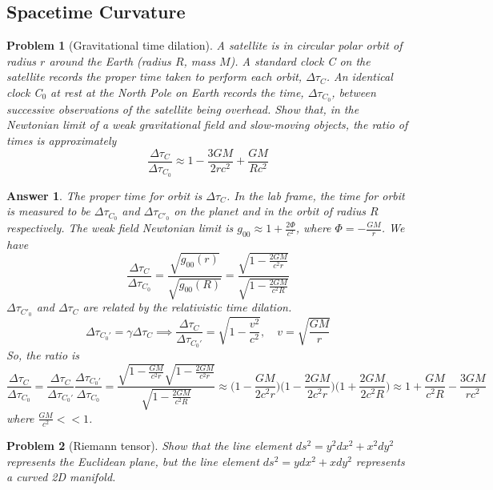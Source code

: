 \documentclass[a4paper]{article}
\theoremstyle{new2}
\newtheorem{ans}{Answer}[section]
\theoremstyle{new}
\newtheorem{qns}{Problem}[section]
\begin{document}
\subsection*{Spacetime Curvature}
\begin{qns}[Gravitational time dilation]
A satellite is in circular polar orbit of radius $r$ around the Earth (radius $R$, mass $M$). A standard clock C on the satellite records the proper time taken to perform each orbit, $\Delta\tau_C$. An identical clock C$_0$ at rest at the North Pole on Earth records the time, $\Delta\tau_{C_0}$, between successive observations of the satellite being overhead. Show that, in the Newtonian limit of a weak gravitational field and slow-moving objects, the ratio of times is approximately
$$\frac{\Delta\tau_C}{\Delta\tau_{C_0}}\approx 1-\frac{3GM}{2rc^2}+\frac{GM}{Rc^2}$$
\end{qns}
\begin{ans}
The proper time for orbit is $\Delta\tau_C$. In the lab frame, the time for orbit is measured to be $\Delta\tau_{C_0}$ and $\Delta\tau_{C'_0}$ on the planet and in the orbit of radius $R$ respectively. The weak field Newtonian limit is $g_{00}\approx1+\frac{2\Phi}{c^2}$, where $\Phi=-\frac{GM}{r}$. We have
$$\frac{\Delta\tau_C}{\Delta\tau_{C_0}}=\frac{\sqrt{g_{00}(r)}}{\sqrt{g_{00}(R)}}=\frac{\sqrt{1-\frac{2GM}{c^2r}}}{\sqrt{1-\frac{2GM}{c^2R}}}$$
$\Delta\tau_{C'_0}$ and $\Delta\tau_C$ are related by the relativistic time dilation.
$$\Delta\tau_{C_0'}=\gamma\Delta\tau_C\implies\frac{\Delta\tau_C}{\Delta\tau_{C_0'}}=\sqrt{1-\frac{v^2}{c^2}},\quad v=\sqrt{\frac{GM}{r}}$$
So, the ratio is
$$\frac{\Delta\tau_C}{\Delta\tau_{C_0}}=\frac{\Delta\tau_C}{\Delta\tau_{C_0'}}\frac{\Delta\tau_{C_0'}}{\Delta\tau_{C_0}}=\frac{\sqrt{1-\frac{GM}{c^2r}}\sqrt{1-\frac{2GM}{c^2r}}}{\sqrt{1-\frac{2GM}{c^2R}}}\approx\bigg(1-\frac{GM}{2c^2r}\bigg)\bigg(1-\frac{2GM}{2c^2r}\bigg)\bigg(1+\frac{2GM}{2c^2R}\bigg)\approx 1+\frac{GM}{c^2R}-\frac{3GM}{rc^2}$$
where $\frac{GM}{c^2}<<1$.
\end{ans}
\newpage
\begin{qns}[Riemann tensor]
Show that the line element $ds^2 = y^2 dx^2 + x^2 dy^2$ represents the Euclidean plane, but the line element $ds^2 = y dx^2 + x dy^2$ represents a curved 2D manifold.
\end{qns}
\end{document}
